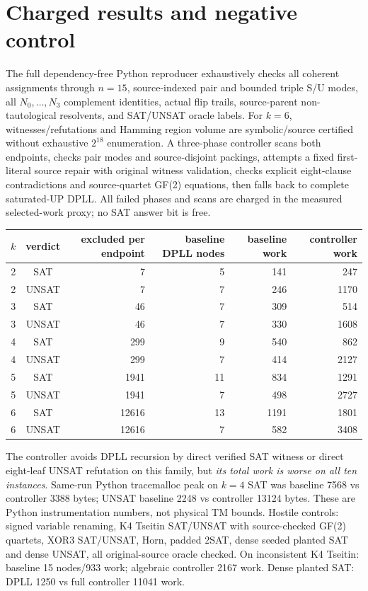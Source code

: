 \documentclass[10pt]{article}
\begin{document}
\section{Charged results and negative control}
The full dependency-free Python reproducer exhaustively checks all coherent assignments through $n=15$, source-indexed pair and bounded triple S/U modes, all $N_0,\ldots,N_3$ complement identities, actual flip trails, source-parent non-tautological resolvents, and SAT/UNSAT oracle labels. For $k=6$, witnesses/refutations and Hamming region volume are symbolic/source certified without exhaustive $2^{18}$ enumeration. A three-phase controller scans both endpoints, checks pair modes and source-disjoint packings, attempts a fixed first-literal source repair with original witness validation, checks explicit eight-clause contradictions and source-quartet GF(2) equations, then falls back to complete saturated-UP DPLL. All failed phases and scans are charged in the measured selected-work proxy; no SAT answer bit is free.
\begin{center}\begin{tabular}{rcrrrr}\toprule
$k$&verdict&excluded per endpoint&baseline DPLL nodes&baseline work&controller work\\\midrule
2&SAT&7&5&141&247\\
2&UNSAT&7&7&246&1170\\
3&SAT&46&7&309&514\\
3&UNSAT&46&7&330&1608\\
4&SAT&299&9&540&862\\
4&UNSAT&299&7&414&2127\\
5&SAT&1941&11&834&1291\\
5&UNSAT&1941&7&498&2727\\
6&SAT&12616&13&1191&1801\\
6&UNSAT&12616&7&582&3408\\\bottomrule
\end{tabular}\end{center}
The controller avoids DPLL recursion by direct verified SAT witness or direct eight-leaf UNSAT refutation on this family, but \emph{its total work is worse on all ten instances}. Same-run Python tracemalloc peak on $k=4$ SAT was baseline 7568 vs controller 3388 bytes; UNSAT baseline 2248 vs controller 13124 bytes. These are Python instrumentation numbers, not physical TM bounds. Hostile controls: signed variable renaming, K4 Tseitin SAT/UNSAT with source-checked GF(2) quartets, XOR3 SAT/UNSAT, Horn, padded 2SAT, dense seeded planted SAT and dense UNSAT, all original-source oracle checked. On inconsistent K4 Tseitin: baseline 15 nodes/933 work; algebraic controller 2167 work. Dense planted SAT: DPLL 1250 vs full controller 11041 work.
\end{document}
